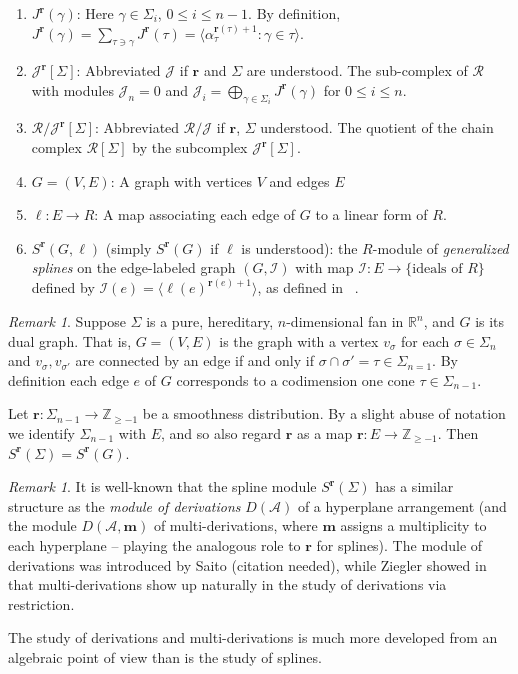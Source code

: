 \documentclass[11pt, reqno]{amsart}
\newcommand{\R}{\mathbb{R}}
\newcommand{\ZZ}{\mathbb{Z}}
\newcommand{\br}{\mathbf{r}}
\newcommand{\calJ}{\mathcal{J}}
\newcommand{\calR}{\mathcal{R}}
\newcommand{\A}{\mathcal{A}}
\theoremstyle{definition}
\theoremstyle{remark}
\newtheorem{remark}[theorem]{Remark}
\numberwithin{equation}{section}
\begin{document}
\begin{enumerate}
\item $J^{\br}(\gamma)$: Here $\gamma\in\Sigma_i$, $0\le i\le n-1$.  By definition, $J^{\br}(\gamma)=\sum_{\tau\ni\gamma} J^{\br}(\tau)=\langle \alpha_\tau^{\br(\tau)+1}: \gamma\in\tau\rangle$.
\item $\calJ^{\br}[\Sigma]$:  Abbreviated $\calJ$ if $\br$ and $\Sigma$ are understood.  The sub-complex of $\calR$ with modules $\calJ_n=0$ and $\calJ_i=\bigoplus_{\gamma\in\Sigma_i} J^{\br}(\gamma)$ for $0\le i\le n$.
\item $\calR/\calJ^{\br}[\Sigma]$: Abbreviated $\calR/\calJ$ if $\br$, $\Sigma$ understood.  The quotient of the chain complex $\calR[\Sigma]$ by the subcomplex $\calJ^{\br}[\Sigma]$.
\item $G=(V,E)$: A graph with vertices $V$ and edges $E$
\item $\ell:E\to R$: A map associating each edge of $G$ to a linear form of $R$.
\item $S^{\br}(G,\ell)$ (simply $S^{\br}(G)$  if $\ell$ is understood): the $R$-module of \textit{generalized splines} on the edge-labeled graph $(G,\mathcal{I})$ with map $\mathcal{I}:E\to \{\mbox{ideals of } R\}$ defined by $\mathcal{I}(e)=\langle \ell(e)^{\br(e)+1}\rangle$, as defined in ~\cite{Gilbert-Tymoczko-Viel-2016}.
\end{enumerate}

\begin{remark}
Suppose $\Sigma$ is a pure, hereditary, $n$-dimensional fan in $\R^n$, and $G$ is its dual graph.  That is, $G=(V,E)$ is the graph with a vertex $v_\sigma$ for each $\sigma\in\Sigma_n$ and $v_{\sigma},v_{\sigma'}$ are connected by an edge if and only if $\sigma\cap\sigma'=\tau\in\Sigma_{n=1}$.  By definition each edge $e$ of $G$ corresponds to a codimension one cone $\tau\in\Sigma_{n-1}$.

Let $\br:\Sigma_{n-1}\to \ZZ_{\ge -1}$ be a smoothness distribution.  By a slight abuse of notation we identify $\Sigma_{n-1}$ with $E$, and so also regard $\br$ as a map $\br:E\to\ZZ_{\ge -1}$.  Then $S^{\br}(\Sigma)=S^{\br}(G)$.
\end{remark}

\begin{remark}
It is well-known that the spline module $S^{\br}(\Sigma)$ has a similar structure as the \textit{module of derivations} $D(\A)$ of a hyperplane arrangement (and the module $D(\A,\mathbf{m})$ of multi-derivations, where $\mathbf{m}$ assigns a multiplicity to each hyperplane -- playing the analogous role to $\br$ for splines).  The module of derivations was introduced by Saito (citation needed), while Ziegler showed in~\cite{Ziegler-Multiarrangements-1989} that multi-derivations show up naturally in the study of derivations via restriction.

The study of derivations and multi-derivations is much more developed from an algebraic point of view than is the study of splines.
\end{remark}
\end{document}
